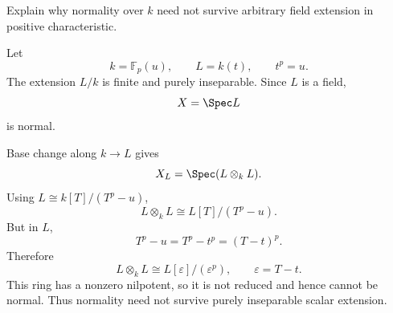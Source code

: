 \begin{problem}\label{prob:vi28-18}
Explain why normality over \(k\) need not survive arbitrary field extension in positive characteristic.

\end{problem}

\ifdefined\FullProblemDossiers
\begin{solution}
Let
\[
k=\mathbb F_p(u),\qquad L=k(t),\qquad t^p=u.
\]
The extension \(L/k\) is finite and purely inseparable. Since \(L\) is a field,
\[
X=\Spec L
\]
is normal.

Base change along \(k\to L\) gives
\[
X_L=\Spec(L\otimes_kL).
\]
Using \(L\cong k[T]/(T^p-u)\),
\[
L\otimes_kL
\cong
L[T]/(T^p-u).
\]
But in \(L\),
\[
T^p-u=T^p-t^p=(T-t)^p.
\]
Therefore
\[
L\otimes_kL
\cong
L[\varepsilon]/(\varepsilon^p),
\qquad
\varepsilon=T-t.
\]
This ring has a nonzero nilpotent, so it is not reduced and hence cannot be normal. Thus normality need not survive purely inseparable scalar extension.
\end{solution}
\fi

